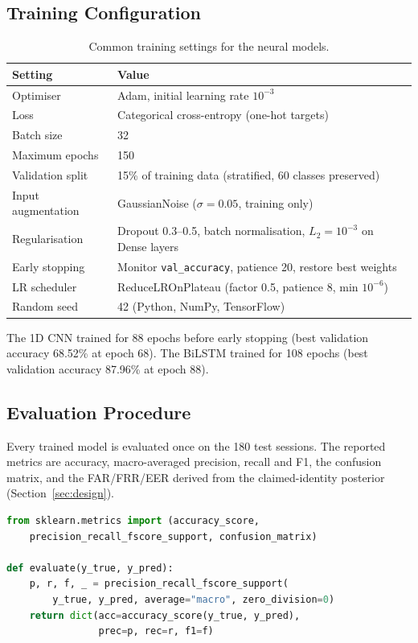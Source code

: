 \subsection{Training Configuration}
\begin{table}[H]
\centering
\caption{Common training settings for the neural models.}
\begin{tabular}{@{}ll@{}}
\toprule
\textbf{Setting} & \textbf{Value} \\ \midrule
Optimiser & Adam, initial learning rate $10^{-3}$ \\
Loss & Categorical cross-entropy (one-hot targets) \\
Batch size & 32 \\
Maximum epochs & 150 \\
Validation split & 15\% of training data (stratified, 60 classes preserved) \\
Input augmentation & GaussianNoise ($\sigma=0.05$, training only) \\
Regularisation & Dropout 0.3--0.5, batch normalisation, $L_2=10^{-3}$ on Dense layers \\
Early stopping & Monitor \texttt{val\_accuracy}, patience 20, restore best weights \\
LR scheduler & ReduceLROnPlateau (factor 0.5, patience 8, min $10^{-6}$) \\
Random seed & 42 (Python, NumPy, TensorFlow) \\ \bottomrule
\end{tabular}
\end{table}

The 1D CNN trained for 88 epochs before early stopping (best validation accuracy 68.52\% at epoch 68). The BiLSTM trained for 108 epochs (best validation accuracy 87.96\% at epoch 88).

\subsection{Evaluation Procedure}
Every trained model is evaluated once on the 180 test sessions. The reported metrics are accuracy, macro-averaged precision, recall and F1, the confusion matrix, and the FAR/FRR/EER derived from the claimed-identity posterior (Section~\ref{sec:design}).
\begin{lstlisting}[language=Python]
from sklearn.metrics import (accuracy_score,
    precision_recall_fscore_support, confusion_matrix)

def evaluate(y_true, y_pred):
    p, r, f, _ = precision_recall_fscore_support(
        y_true, y_pred, average="macro", zero_division=0)
    return dict(acc=accuracy_score(y_true, y_pred),
                prec=p, rec=r, f1=f)
\end{lstlisting}

